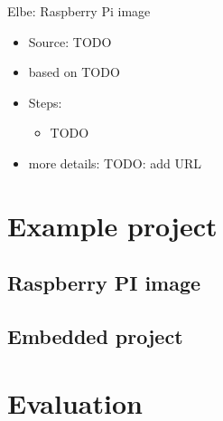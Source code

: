 \documentclass{beamer}
\begin{document}
\begin{frame}{Elbe: Raspberry Pi image}
	\begin{itemize}
		\item Source: TODO
		\item based on TODO
		\item Steps:
		\begin{itemize}
			\item TODO
		\end{itemize}
		\item more details: TODO: add URL
	\end{itemize}
\end{frame}

\section{Example project}

\subsection{Raspberry PI image}


\subsection{Embedded project}


\section{Evaluation}





\end{document}

